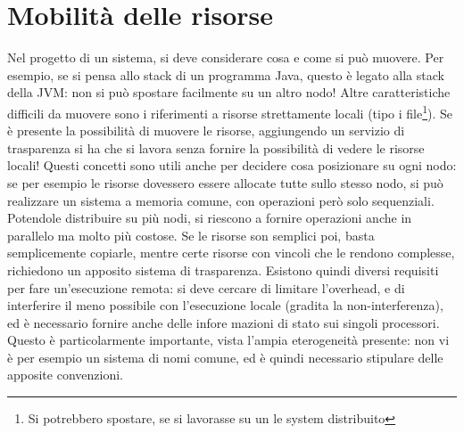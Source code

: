 \section{Mobilità delle risorse}
Nel progetto di un sistema, si deve considerare cosa e come si può muovere. Per esempio, se si pensa allo stack di un
programma Java, questo è legato alla stack della JVM: non si può spostare facilmente su un altro nodo! Altre
caratteristiche difficili da muovere sono i riferimenti a risorse strettamente locali (tipo i file\footnote{Si
potrebbero spostare, se si lavorasse su un le system distribuito}).
Se è presente la possibilità di muovere le risorse, aggiungendo un servizio di trasparenza si ha che si lavora senza
fornire la possibilità di vedere le risorse locali!
Questi concetti sono utili anche per decidere cosa posizionare su ogni nodo: se per esempio le risorse dovessero essere
allocate tutte sullo stesso nodo, si può realizzare un sistema a memoria comune, con operazioni però solo sequenziali.
Potendole distribuire su più nodi, si riescono a fornire operazioni anche in parallelo ma molto più costose. Se le
risorse son semplici poi, basta semplicemente copiarle, mentre certe risorse con vincoli che le rendono complesse,
richiedono un apposito sistema di trasparenza.
Esistono quindi diversi requisiti per fare un'esecuzione remota: si deve cercare di limitare l'overhead, e di
interferire il meno possibile con l'esecuzione locale (gradita la non-interferenza), ed è necessario fornire anche delle
infore mazioni di stato sui singoli processori. Questo è particolarmente importante, vista l'ampia eterogeneità
presente: non vi è per esempio un sistema di nomi comune, ed è quindi necessario stipulare delle apposite convenzioni.
